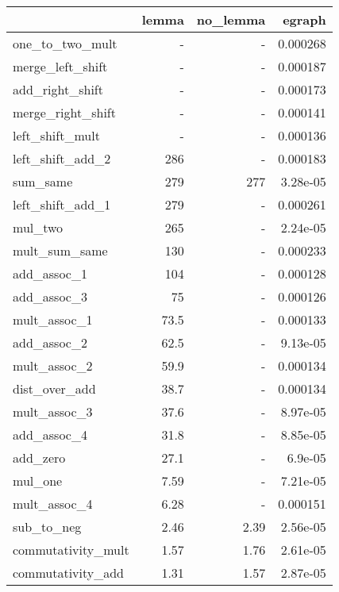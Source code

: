 \begin{tabular}{lrrr}
\toprule
 & lemma & no_lemma & egraph \\
\midrule
one_to_two_mult & - & - & 0.000268 \\
merge_left_shift & - & - & 0.000187 \\
add_right_shift & - & - & 0.000173 \\
merge_right_shift & - & - & 0.000141 \\
left_shift_mult & - & - & 0.000136 \\
left_shift_add_2 & 286 & - & 0.000183 \\
sum_same & 279 & 277 & 3.28e-05 \\
left_shift_add_1 & 279 & - & 0.000261 \\
mul_two & 265 & - & 2.24e-05 \\
mult_sum_same & 130 & - & 0.000233 \\
add_assoc_1 & 104 & - & 0.000128 \\
add_assoc_3 & 75 & - & 0.000126 \\
mult_assoc_1 & 73.5 & - & 0.000133 \\
add_assoc_2 & 62.5 & - & 9.13e-05 \\
mult_assoc_2 & 59.9 & - & 0.000134 \\
dist_over_add & 38.7 & - & 0.000134 \\
mult_assoc_3 & 37.6 & - & 8.97e-05 \\
add_assoc_4 & 31.8 & - & 8.85e-05 \\
add_zero & 27.1 & - & 6.9e-05 \\
mul_one & 7.59 & - & 7.21e-05 \\
mult_assoc_4 & 6.28 & - & 0.000151 \\
sub_to_neg & 2.46 & 2.39 & 2.56e-05 \\
commutativity_mult & 1.57 & 1.76 & 2.61e-05 \\
commutativity_add & 1.31 & 1.57 & 2.87e-05 \\
\bottomrule
\end{tabular}
